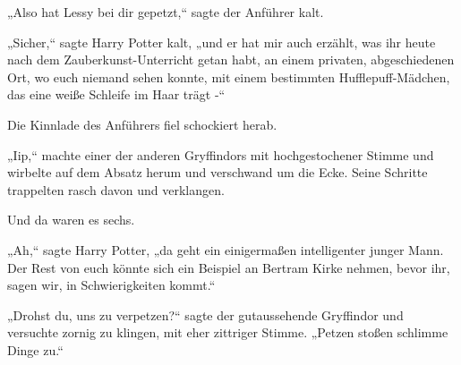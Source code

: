 „Also hat Lessy bei dir gepetzt,“ sagte der Anführer kalt.

„Sicher,“ sagte Harry Potter kalt, „und er hat mir auch erzählt, was ihr heute nach dem Zauberkunst-Unterricht getan habt, an einem privaten, abgeschiedenen Ort, wo euch niemand sehen konnte, mit einem bestimmten Hufflepuff-Mädchen, das eine weiße Schleife im Haar trägt -“

Die Kinnlade des Anführers fiel schockiert herab.

„Iip,“ machte einer der anderen Gryffindors mit hochgestochener Stimme und wirbelte auf dem Absatz herum und verschwand um die Ecke. Seine Schritte trappelten rasch davon und verklangen.

Und da waren es sechs.

„Ah,“ sagte Harry Potter, „da geht ein einigermaßen intelligenter junger Mann. Der Rest von euch könnte sich ein Beispiel an Bertram Kirke nehmen, bevor ihr, sagen wir, in Schwierigkeiten kommt.“%

„Drohst du, uns zu verpetzen?“ sagte der gutaussehende Gryffindor und versuchte zornig zu klingen, mit eher zittriger Stimme. „Petzen stoßen schlimme Dinge zu.“


